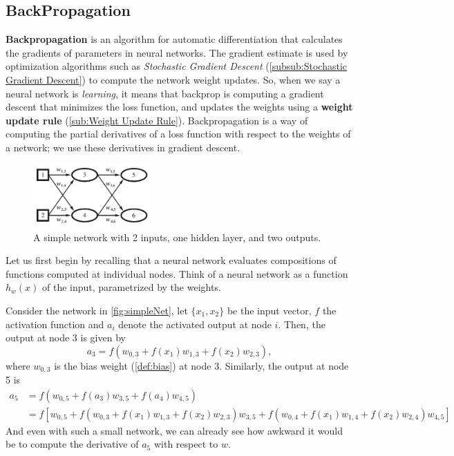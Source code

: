 \documentclass{article}
\begin{document}
\subsection{BackPropagation}%
  \label{sub:BackPropagation}
\textbf{Backpropagation} is an algorithm for automatic differentiation that calculates the gradients of parameters in neural networks. The gradient estimate is used by optimization algorithms such as \textit{Stochastic Gradient Descent} (\autoref{subsub:Stochastic Gradient Descent}) to compute the network weight updates. So, when we say a neural network is \textit{learning}, it means that backprop is computing a gradient descent that minimizes the loss function, and updates the weights using a \textbf{weight update rule} (\autoref{sub:Weight Update Rule}). Backpropagation is a way of computing the partial derivatives of a loss function with respect to the weights of a network; we use these derivatives in gradient descent. 
\begin{figure} %
    \centering
    \includegraphics[width=0.4\textwidth]{simpleNet}
    \caption{A simple network with 2 inputs, one hidden layer, and two outputs.}
    \label{fig:simpleNet}
\end{figure}
  Let us first begin by recalling that a neural network evaluates compositions of functions computed at individual nodes. Think of a neural network as a function $h_w(x)$ of the input, parametrized by the weights. 
\begin{example}
   Consider the network in \autoref{fig:simpleNet}, let $\{x_1,x_2\}$ be the input vector, $f$ the activation function and $a_i$ denote the activated output at node $i$. Then, the output at node 3 is given by
  $$a_3 = f(w_{0, 3} + f(x_1)w_{1,3} + f(x_2)w_{2,3}), $$
  where $w_{0,3}$ is the bias weight (\autoref{def:bias}) at node 3. Similarly, the output at node 5 is
  \begin{equation*}
    \begin{split}
      a_5 &= f( w_{0,5} + f(a_3) w_{3,5} + f(a_4) w_{4,5}  )\\ 
      &= f[w_{0,5} + f(w_{0, 3} + f(x_1)w_{1,3} + f(x_2)w_{2,3})w_{3,5} +f(w_{0, 4} + f(x_1)w_{1,4} + f(x_2)w_{2,4})w_{4,5} ]
    \end{split}
  \end{equation*}
  And even with such a small network, we can already see how awkward it would be to compute the derivative of $a_5$ with respect to $w$. 
\end{example}
\end{document}
